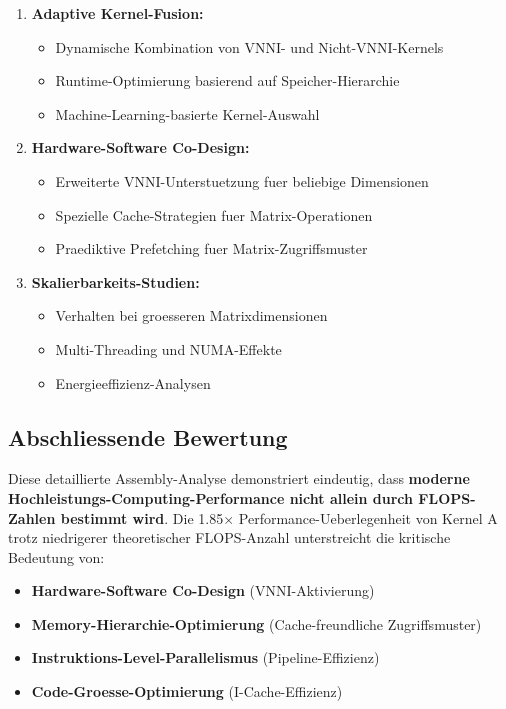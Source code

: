 \documentclass[11pt,a4paper]{article}
\begin{document}
\begin{enumerate}
\item \textbf{Adaptive Kernel-Fusion:}
   \begin{itemize}
   \item Dynamische Kombination von VNNI- und Nicht-VNNI-Kernels
   \item Runtime-Optimierung basierend auf Speicher-Hierarchie
   \item Machine-Learning-basierte Kernel-Auswahl
   \end{itemize}

\item \textbf{Hardware-Software Co-Design:}
   \begin{itemize}
   \item Erweiterte VNNI-Unterstuetzung fuer beliebige Dimensionen
   \item Spezielle Cache-Strategien fuer Matrix-Operationen
   \item Praediktive Prefetching fuer Matrix-Zugriffsmuster
   \end{itemize}

\item \textbf{Skalierbarkeits-Studien:}
   \begin{itemize}
   \item Verhalten bei groesseren Matrixdimensionen
   \item Multi-Threading und NUMA-Effekte
   \item Energieeffizienz-Analysen
   \end{itemize}
\end{enumerate}

\subsection{Abschliessende Bewertung}

Diese detaillierte Assembly-Analyse demonstriert eindeutig, dass \textbf{moderne Hochleistungs-Computing-Performance nicht allein durch FLOPS-Zahlen bestimmt wird}. Die 1.85$\times$ Performance-Ueberlegenheit von Kernel A trotz niedrigerer theoretischer FLOPS-Anzahl unterstreicht die kritische Bedeutung von:

\begin{itemize}
\item \textbf{Hardware-Software Co-Design} (VNNI-Aktivierung)
\item \textbf{Memory-Hierarchie-Optimierung} (Cache-freundliche Zugriffsmuster)  
\item \textbf{Instruktions-Level-Parallelismus} (Pipeline-Effizienz)
\item \textbf{Code-Groesse-Optimierung} (I-Cache-Effizienz)
\end{itemize}
\end{document}
